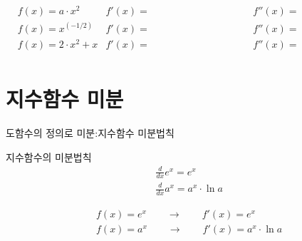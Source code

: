 \documentclass[aspectratio=169]{beamer}
\begin{document}
\begin{frame}%
  \begin{align*}
    & f(x) = a \cdot x^2      & f'(x) = \hspace{4cm} & f''(x) = \hspace{4cm} \\[2em]
    & f(x) = x^{(-1/2)}   & f'(x) = \hspace{4cm} & f''(x) = \hspace{4cm} \\[2em]
    & f(x) = 2 \cdot x^2 + x  & f'(x) = \hspace{4cm} & f''(x) = \hspace{4cm} \\[2em]
  \end{align*}
\end{frame}







\section{지수함수 미분}
% 
\begin{frame}{도함수의 정의로 미분:지수함수 미분법칙}
  \begin{block}{지수함수의 미분법칙}
    \begin{align*}
      & \frac{d}{dx} e^x = e^x \\
      & \frac{d}{dx} a^x = a^x \cdot \ln a   
    \end{align*}
  \end{block}
  \begin{align*}
    & f(x) = e^x \qquad \rightarrow \qquad f'(x) = e^x \\
    & f(x) = a^x \qquad \rightarrow \qquad  f'(x) = a^x \cdot \ln a
  \end{align*}
\end{frame}
\end{document}
